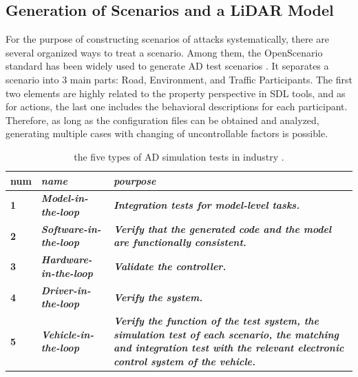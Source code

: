 \documentclass[conference]{IEEEtran}
\begin{document}
\subsection{Generation of Scenarios and a LiDAR Model}
For the purpose of constructing scenarios of attacks systematically, there are several organized ways to treat a scenario. Among them, the OpenScenario standard has been widely used to generate AD test scenarios \cite{b11}. It separates a scenario into 3 main parts: Road, Environment, and Traffic Participants. The first two elements are highly related to the property perspective in SDL tools, and as for actions, the last one includes the behavioral descriptions for each participant. Therefore, as long as the configuration files can be obtained and analyzed, generating multiple cases with changing of uncontrollable factors is possible. 
\begin{table}[htbp]
\caption{the five types of AD simulation tests in industry \cite{b4}.}
\begin{center}
\begin{tabular}{|l|p{3.4cm}|p{3.4cm}|}
\hline
\textbf{num} & \textbf{\textit{name}}& \textbf{\textit{pourpose}} \\
\hline
\textbf{1} & \textbf{\textit{Model-in-the-loop}}& \textbf{\textit{Integration tests for model-level tasks.}} \\
\hline
\textbf{2} & \textbf{\textit{Software-in-the-loop}}& \textbf{\textit{Verify that the generated code and the model are functionally consistent.}} \\
\hline
\textbf{3} & \textbf{\textit{Hardware-in-the-loop}}& \textbf{\textit{Validate the controller.}} \\
\hline
\textbf{4} & \textbf{\textit{Driver-in-the-loop}}& \textbf{\textit{Verify the system.}} \\
\hline
\textbf{5} & \textbf{\textit{Vehicle-in-the-loop}}& \textbf{\textit{Verify the function of the test system, the simulation test of each scenario, the matching and integration test with the relevant electronic control system of the vehicle.}} \\
\hline
\end{tabular}
\label{tab1}
\end{center}
\end{table}
\end{document}
